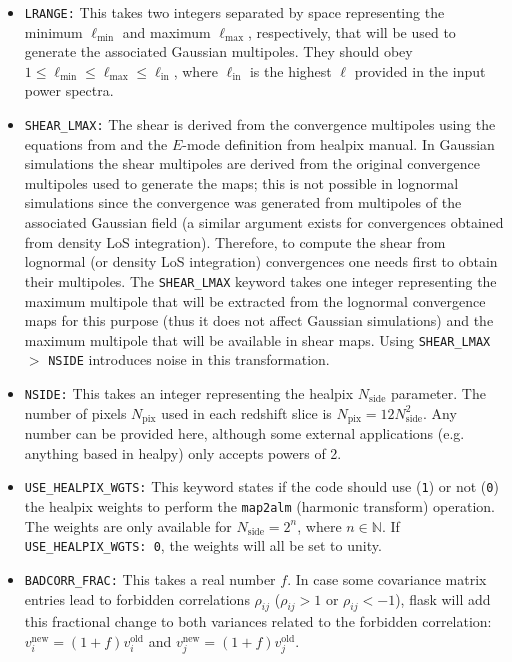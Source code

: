 \documentclass[12pt]{book} %
\newcommand{\nv}[1]{\mathrm{#1}}                 %
\begin{document}
\begin{itemize}
\item {\tt LRANGE:} This takes two integers separated by space representing the minimum 
  $\ell_{\nv{min}}$ and maximum $\ell_{\nv{max}}$, respectively, that will be used to generate the 
  associated Gaussian multipoles. They should obey $1 \leq \ell_{\nv{min}} \leq \ell_{\nv{max}} \leq \ell_{\nv{in}}$, 
  where $\ell_{\nv{in}}$ is the highest $\ell$ provided in the input power spectra.

\item {\tt SHEAR\_LMAX:} The shear is derived from the convergence multipoles using the equations 
  from \citet{Hu00x} and the $E$-mode definition from {\sc healpix} manual. In Gaussian simulations 
  the shear multipoles are derived from the original convergence multipoles used to generate the maps; 
  this is not possible in lognormal simulations since the convergence was generated from multipoles of the 
  associated Gaussian field (a similar argument exists for convergences obtained from density LoS integration). 
  Therefore, to compute the shear from lognormal (or density LoS integration) convergences one needs first to 
  obtain their multipoles. The {\tt SHEAR\_LMAX} keyword takes one integer representing 
  the maximum multipole that will be extracted from the lognormal convergence maps for this purpose (thus it 
  does not affect Gaussian simulations) and the maximum multipole that will be available in shear maps. 
  Using {\tt SHEAR\_LMAX} $>$ {\tt NSIDE} introduces noise in this transformation.
  
\item {\tt NSIDE:} This takes an integer representing the {\sc healpix} $N_{\nv{side}}$ parameter. 
  The number of pixels $N_{\nv{pix}}$ used in each redshift slice is $N_{\nv{pix}}=12N_{\nv{side}}^2$. 
  Any number can be provided here, although some external applications (e.g. anything based 
  in {\sc healpy}) only accepts powers of 2.

\item {\tt USE\_HEALPIX\_WGTS:} This keyword states if the code should use ({\tt 1}) or not ({\tt 0}) 
  the {\sc healpix} weights to perform the {\tt map2alm} (harmonic transform) operation. The 
  weights are only available for $N_{\nv{side}}=2^n$, where $n\in \mathbb{N}$. If 
  {\tt USE\_HEALPIX\_WGTS: 0}, the weights will all be set to unity.

\item {\tt BADCORR\_FRAC:} This takes a real number $f$. In case some covariance matrix entries 
  lead to forbidden correlations $\rho_{ij}$ ($\rho_{ij}>1$ or $\rho_{ij}<-1$), {\sc flask} will 
  add this fractional change to both variances related to the forbidden correlation: 
  $v_i^{\nv{new}} = (1+f)v_i^{\nv{old}}$ and $v_j^{\nv{new}} = (1+f)v_j^{\nv{old}}$.


\end{itemize}
\end{document}
